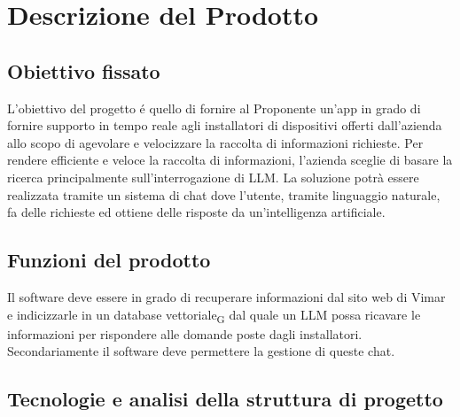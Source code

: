 \section{Descrizione del Prodotto}
\subsection{Obiettivo fissato}
L’obiettivo del progetto é quello di fornire al Proponente un’app in grado di fornire supporto in tempo reale agli installatori di dispositivi offerti dall’azienda allo scopo di agevolare e velocizzare la raccolta di informazioni richieste. Per rendere efficiente e veloce la raccolta di informazioni, l’azienda sceglie di basare la ricerca principalmente sull’interrogazione di LLM. La soluzione potrà essere realizzata tramite un sistema di chat dove l’utente, tramite linguaggio naturale, fa delle richieste ed ottiene delle risposte da un’intelligenza artificiale.

\subsection{Funzioni del prodotto}
Il software deve essere in grado di recuperare informazioni dal sito web di Vimar e indicizzarle in un database vettoriale\textsubscript{G} dal quale un LLM possa ricavare le informazioni per rispondere alle domande poste dagli installatori.
Secondariamente il software deve permettere la gestione di queste chat.

\subsection{Tecnologie  e analisi della struttura di progetto} 

